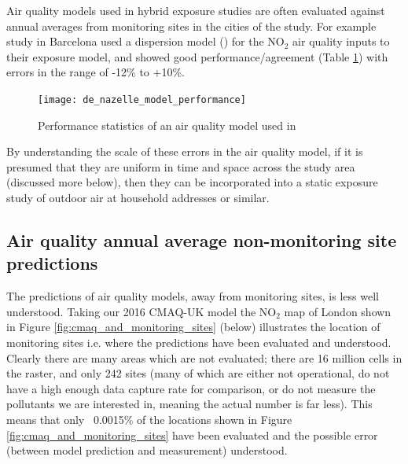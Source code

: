 Air quality models used in hybrid exposure studies are often evaluated against annual averages from monitoring sites in the cities of the study. For example \cite{DeNazelle2013} study in Barcelona used a dispersion model (\cite{Lao2011}) for the NO$_{2}$ air quality inputs to their exposure model, and showed good performance/agreement (Table \ref{tab:fig:de_nazelle_model_performance}) with errors in the range of -12\% to +10\%.

\begin{figure}[H]
\centering
\texttt{[image: de\_nazelle\_model\_performance]}
\caption{Performance statistics of an air quality model used in \cite{DeNazelle2013}}
\label{tab:fig:de_nazelle_model_performance}
\end{figure}

By understanding the scale of these errors in the air quality model, if it is presumed that they are uniform in time and space across the study area (discussed more below), then they can be incorporated into a static exposure study of outdoor air at household addresses or similar.

\subsection{Air quality annual average non-monitoring site predictions}
\label{air_quality_annual_average_non_site_predictions}

The predictions of air quality models, away from monitoring sites, is less well understood. Taking our 2016 CMAQ-UK model the NO$_{2}$ map of London shown in Figure \ref{fig:cmaq_and_monitoring_sites} (below) illustrates the location of monitoring sites i.e. where the predictions have been evaluated and understood. Clearly there are many areas which are not evaluated; there are 16 million cells in the raster, and only 242 sites (many of which are either not operational, do not have a high enough data capture rate for comparison, or do not measure the pollutants we are interested in, meaning the actual number is far less). This means that only ~0.0015\% of the locations shown in Figure \ref{fig:cmaq_and_monitoring_sites} have been evaluated and the possible error (between model prediction and measurement) understood.

